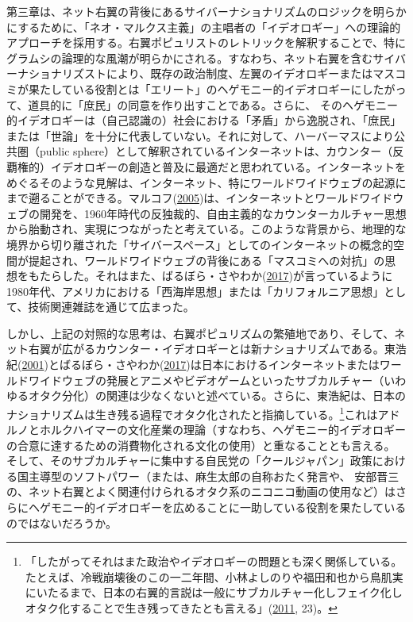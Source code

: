 \documentclass[10pt,british,A4paper,oneside]{memoir}
\begin{document}
第三章は、ネット右翼の背後にあるサイバーナショナリズムのロジックを明らかにするために、「ネオ・マルクス主義」の主唱者の「イデオロギー」への理論的アプローチを採用する。右翼ポピュリストのレトリックを解釈することで、特にグラムシの論理的な風潮が明らかにされる。すなわち、ネット右翼を含むサイバーナショナリズストにより、既存の政治制度、左翼のイデオロギーまたはマスコミが果たしている役割とは「エリート」のヘゲモニー的イデオロギーにしたがって、道具的に「庶民」の同意を作り出すことである。さらに、
そのヘゲモニー的イデオロギーは（自己認識の）社会における「矛盾」から逸脱され、「庶民」または「世論」を十分に代表していない。それに対して、ハーバーマスにより公共圏（public
sphere）として解釈されているインターネットは、カウンター（反覇権的）イデオロギーの創造と普及に最適だと思われている。インターネットをめぐるそのような見解は、インターネット、特にワールドワイドウェブの起源にまで遡ることができる。マルコフ(\protect\hyperlink{ref-markoff_what_2005}{2005})は、インターネットとワールドワイドウェブの開発を、1960年時代の反独裁的、自由主義的なカウンターカルチャー思想から胎動され、実現につながったと考えている。このような背景から、地理的な境界から切り離された「サイバースペース」としてのインターネットの概念的空間が提起され、ワールドワイドウェブの背後にある「マスコミへの対抗」の思想をもたらした。それはまた、ばるぼら・さやわか(\protect\hyperlink{ref-barubora_eng:_2017}{2017})が言っているように1980年代、アメリカにおける「西海岸思想」または「カリフォルニア思想」として、技術関連雑誌を通じて広まった。

しかし、上記の対照的な思考は、右翼ポピュリズムの繁殖地であり、そして、ネット右翼が広がるカウンター・イデオロギーとは新ナショナリズムである。東浩紀(\protect\hyperlink{ref-azuma_otaku:_2001}{2001})とばるぼら・さやわか(\protect\hyperlink{ref-barubora_eng:_2017}{2017})は日本におけるインターネットまたはワールドワイドウェブの発展とアニメやビデオゲームといったサブカルチャー（いわゆるオタク分化）の関連は少なくないと述べている。さらに、東浩紀は、日本のナショナリズムは生き残る過程でオタク化されたと指摘している。\footnote{「したがってそれはまた政治やイデオロギーの問題とも深く関係している。たとえば、冷戦崩壊後のこの一二年間、小林よしのりや福田和也から鳥肌実にいたるまで、日本の右翼的言説は一般にサブカルチャー化しフェイク化しオタク化することで生き残ってきたとも言える」(\protect\hyperlink{ref-azuma_ippan_2011}{2011},
  23)。}これはアドルノとホルクハイマーの文化産業の理論（すなわち、ヘゲモニー的イデオロギーの合意に達するための消費物化される文化の使用）と重なることとも言える。
そして、そのサブカルチャーに集中する自民党の「クールジャパン」政策における国主導型のソフトパワー（または、麻生太郎の自称おたく発言や、
安部晋三の、ネット右翼とよく関連付けられるオタク系のニコニコ動画の使用など）はさらにヘゲモニー的イデオロギーを広めることに一助している役割を果たしているのではないだろうか。
\end{document}
